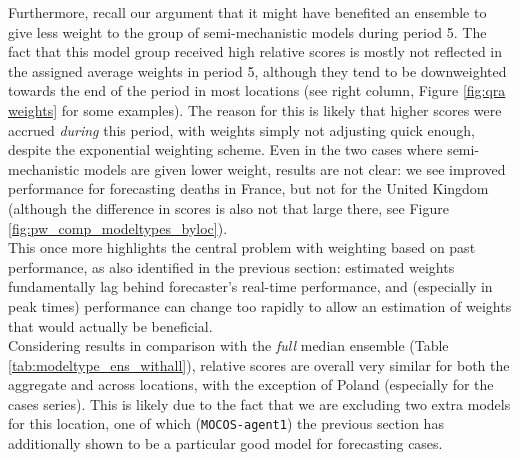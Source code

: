 Furthermore, recall our argument that it might have benefited an ensemble to give less weight to the group of semi-mechanistic models during period 5. The fact that this model group received high relative scores is mostly not reflected in the assigned average weights in period 5, although they tend to be downweighted towards the end of the period in most locations (see right column, Figure \ref{fig:qra weights} for some examples). The reason for this is likely that higher scores were accrued \textit{during} this period, with weights simply not adjusting quick enough, despite the exponential weighting scheme. Even in the two cases where semi-mechanistic models are given lower weight, results are not clear: we see improved performance for forecasting deaths in France, but not for the United Kingdom (although the difference in scores is also not that large there, see Figure \ref{fig:pw_comp_modeltypes_byloc}). \\
This once more highlights the central problem with weighting based on past performance, as also identified in the previous section: estimated weights fundamentally lag behind forecaster's real-time performance, and (especially in peak times) performance can change too rapidly to allow an estimation of weights that would actually be beneficial.\\ 
Considering results in comparison with the \textit{full} median ensemble (Table \ref{tab:modeltype_ens_withall}), relative scores are overall very similar for both the aggregate and across locations, with the exception of Poland (especially for the cases series). This is likely due to the fact that we are excluding two extra models for this location, one of which (\texttt{MOCOS-agent1}) the previous section has additionally shown to be a particular good model for forecasting cases.\\

